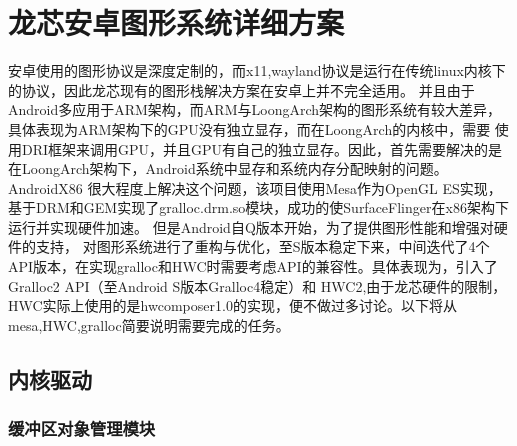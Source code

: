 \section{龙芯安卓图形系统详细方案}
安卓使用的图形协议是深度定制的，而x11,wayland协议是运行在传统linux内核下的协议，因此龙芯现有的图形栈解决方案在安卓上并不完全适用。
并且由于Android多应用于ARM架构，而ARM与LoongArch架构的图形系统有较大差异，具体表现为ARM架构下的GPU没有独立显存\cite{Inki}，而在LoongArch的内核中，需要
使用DRI框架来调用GPU，并且GPU有自己的独立显存。因此，首先需要解决的是在LoongArch架构下，Android系统中显存和系统内存分配映射的问题。AndroidX86\cite{AndroidX86}
很大程度上解决这个问题，该项目使用Mesa作为OpenGL ES实现，基于DRM和GEM实现了gralloc.drm.so模块，成功的使SurfaceFlinger在x86架构下运行并实现硬件加速\cite{XTYY201710015}。
但是Android自Q版本开始，为了提供图形性能和增强对硬件的支持，
对图形系统进行了重构与优化，至S版本稳定下来，中间迭代了4个API版本，在实现gralloc和HWC时需要考虑API的兼容性。具体表现为，引入了Gralloc2 API（至Android S版本Gralloc4稳定）和
HWC2,由于龙芯硬件的限制，HWC实际上使用的是hwcomposer1.0的实现，便不做过多讨论。以下将从mesa,HWC,gralloc简要说明需要完成的任务。

\subsection{内核驱动}

\subsubsection{缓冲区对象管理模块}


